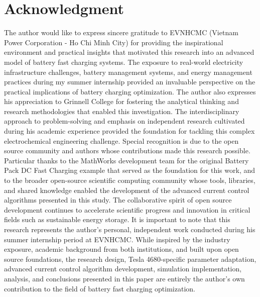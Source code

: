 \documentclass[conference]{IEEEtran}
\begin{document}
\section*{Acknowledgment}
The author would like to express sincere gratitude to EVNHCMC (Vietnam Power Corporation - Ho Chi Minh City) for providing the inspirational environment and practical insights that motivated this research into an advanced model of battery fast charging systems. The exposure to real-world electricity infrastructure challenges, battery management systems, and energy management practices during my summer internship provided an invaluable perspective on the practical implications of battery charging optimization.
The author also expresses his appreciation to Grinnell College for fostering the analytical thinking and research methodologies that enabled this investigation. The interdisciplinary approach to problem-solving and emphasis on independent research cultivated during his academic experience provided the foundation for tackling this complex electrochemical engineering challenge.
Special recognition is due to the open source community and authors whose contributions made this research possible. Particular thanks to the MathWorks development team for the original Battery Pack DC Fast Charging example that served as the foundation for this work, and to the broader open-source scientific computing community whose tools, libraries, and shared knowledge enabled the development of the advanced current control algorithms presented in this study. The collaborative spirit of open source development continues to accelerate scientific progress and innovation in critical fields such as sustainable energy storage.
It is important to note that this research represents the author's personal, independent work conducted during his summer internship period at EVNHCMC. While inspired by the industry exposure, academic background from both institutions, and built upon open source foundations, the research design, Tesla 4680-specific parameter adaptation, advanced current control algorithm development, simulation implementation, analysis, and conclusions presented in this paper are entirely the author's own contribution to the field of battery fast charging optimization.



\end{document}
